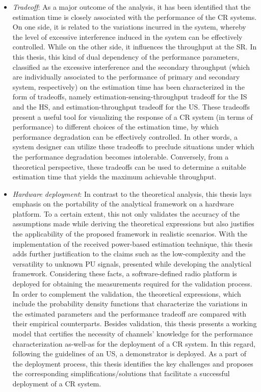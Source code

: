 \begin{itemize}
\item \textit{Tradeoff}: 
As a major outcome of the analysis, it has been identified that the estimation time is closely associated with the performance of the CR systems. On one side, it is related to the variations incurred in the system, whereby the level of excessive interference induced in the system can be effectively controlled. While on the other side, it influences the throughput at the SR. In this thesis, this kind of dual dependency of the performance parameters, classified as the excessive interference and the secondary throughput (which are individually associated to the performance of primary and secondary system, respectively) on the estimation time has been characterized in the form of tradeoffs, namely estimation-sensing-throughput tradeoff for the IS and the HS, and estimation-throughput tradeoff for the US. These tradeoffs present a useful tool for visualizing the response of a CR system (in terms of performance) to different choices of the estimation time, by which performance degradation can be effectively controlled. In other words, a system designer can utilize these tradeoffs to preclude situations under which the performance degradation becomes intolerable. Conversely, from a theoretical perspective, these tradeoffs can be used to determine a suitable estimation time that yields the maximum achievable throughput.
 
 
\item \textit{Hardware deployment}: 
In contrast to the theoretical analysis, this thesis lays emphasis on the portability of the analytical framework on a hardware platform. To a certain extent, this not only validates the accuracy of the assumptions made while deriving the theoretical expressions but also justifies the applicability of the proposed framework in realistic scenarios. With the implementation of the received power-based estimation technique, this thesis adds further justification to the claims such as the low-complexity and the versatility to unknown PU signals, presented while developing the analytical framework. Considering these facts, a software-defined radio platform is deployed for obtaining the measurements required for the validation process. In order to complement the validation, the theoretical expressions, which include the probability density functions that characterize the variations in the estimated parameters and the performance tradeoff are compared with their empirical counterparts. Besides validation, this thesis presents a working model that certifies the necessity of channels' knowledge for the performance characterization as-well-as for the deployment of a CR system. In this regard, following the guidelines of an US, a demonstrator is deployed. As a part of the deployment process, %
this thesis identifies the key challenges and proposes the corresponding simplifications/solutions that facilitate a successful deployment of a CR system.  
\end{itemize}

